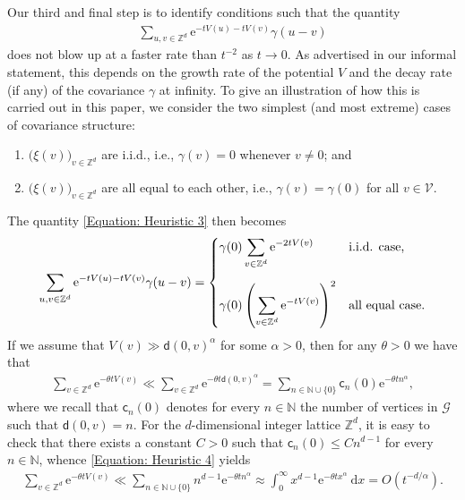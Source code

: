 \documentclass{amsart}
\numberwithin{equation}{section}
\theoremstyle{definition}
\newcommand\al{\alpha}
\newcommand\ga{\gamma}
\renewcommand\d{~\mathrm d}
\newcommand\mbb{\mathbb}
\newcommand\mr{\mathrm}
\newcommand\ms{\mathscr}
\newcommand\msf{\mathsf}
\begin{document}
%

Our third and final step is to identify conditions such that the quantity
\begin{align}
\label{Equation: Heuristic 3}
\sum_{u,v\in\mbb Z^d}\mr e^{-tV(u)-tV(v)}\ga(u-v)
\end{align}
does not blow up at a faster rate than $t^{-2}$ as $t\to0$. As advertised
in our informal statement, this depends on the growth rate of the potential $V$
and the decay rate (if any) of the covariance $\ga$ at infinity. To give an
illustration of how this is carried out in this paper, we consider the two simplest
(and most extreme) cases of covariance structure:
\begin{enumerate}
\item $\big(\xi(v)\big)_{v\in\mbb Z^d}$ are i.i.d., i.e., $\ga(v)=0$ whenever $v\neq 0$; and
\item $\big(\xi(v)\big)_{v\in\mbb Z^d}$ are all equal to each other, i.e., $\ga(v)=\ga(0)$ for all $v\in\ms V$.
\end{enumerate}
The quantity \eqref{Equation: Heuristic 3} then becomes
\[\sum_{u,v\in\mbb Z^d}\mr e^{-tV(u)-tV(v)}\ga(u-v)=\begin{cases}
\displaystyle
\ga(0)\sum_{v\in\mbb Z^d}\mr e^{-2tV(v)}&\text{i.i.d. case,}
\vspace{10pt}\\
\displaystyle
\ga(0)\left(\sum_{v\in\mbb Z^d}\mr e^{-tV(v)}\right)^2&\text{all equal case.}
\end{cases}\]
If we assume that $V(v)\gg\msf d(0,v)^\al$ for some $\al>0$,
then for any $\theta>0$ we have that
\begin{align}
\label{Equation: Heuristic 4}
\sum_{v\in\mbb Z^d}\mr e^{-\theta tV(v)}\ll\sum_{v\in\mbb Z^d}\mr e^{-\theta t\msf d(0,v)^\al}=\sum_{n\in\mbb N\cup\{0\}}\msf c_n(0)\mr e^{-\theta tn^\al},
\end{align}
where we recall that $\msf c_n(0)$ denotes for every $n\in\mbb N$ the number of vertices in $\ms G$ such that $\msf d(0,v)=n$.
For the $d$-dimensional integer lattice $\mbb Z^d$, it is easy to check that there exists a constant $C>0$ such that $\msf c_n(0)\leq Cn^{d-1}$
for every $n\in\mbb N$, whence \eqref{Equation: Heuristic 4} yields
\begin{align}
\label{Equation: Heuristic 5}
\sum_{v\in\mbb Z^d}\mr e^{-\theta tV(v)}\ll\sum_{n\in\mbb N\cup\{0\}}n^{d-1}\mr e^{-\theta tn^\al}\approx\int_0^\infty x^{d-1}\mr e^{-\theta tx^\al}\d x=O(t^{-d/\al}).
\end{align}
\end{document}
